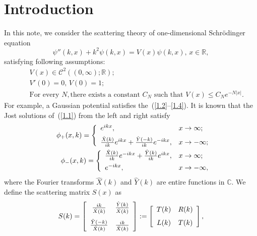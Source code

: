 \documentclass[10pt,a4paper]{article}
\theoremstyle{plain}
\theoremstyle{definition}
\theoremstyle{remark}
\numberwithin{equation}{section}
\begin{document}
\section{Introduction}
In this note, we consider the scattering theory of one-dimensional Schr\"{o}dinger equation
\begin{equation}\label{1.1}
\psi''(k,x)+k^{2}\psi(k,x)=V(x)\psi(k,x),\,x\in\mathbb{R},
\end{equation}
satisfying following assumptions:
\begin{eqnarray}\label{1.2}
&&V(x)\in \mathcal{C}^{2}((0,\infty);\mathbb{R});\\
&&V'(0)=0,\,V(0)=1;\\\label{1.4}
&&\mbox{For every }N, \mbox{there exists a constant }C_{N}\mbox{ such that }V(x)\leq C_{N}e^{-N|x|}.
\end{eqnarray}
For example, a Gaussian potential satisfies the~(\ref{1.2}--\ref{1.4}). 
It is known that the Jost solutions of~(\ref{1.1}) from the left and right satisfy
\begin{eqnarray}\label{AB}
&&\phi_{+}(x,k)=\left\{%
\begin{array}{ll}
e^{ikx},&x\rightarrow\infty;\vspace{5pt}\\
\frac{\hat{X}(k)}{ik}e^{ikx}+\frac{\hat{Y}(-k)}{ik}e^{-ikx},&x\rightarrow-\infty;\label{CD}
\end{array}%
\right.\\
&&\phi_{-}(x,k)=\left\{%
\begin{array}{ll}
\frac{\hat{X}(k)}{ik}e^{-ikx}+\frac{\hat{Y}(k)}{ik}e^{ikx},&x\rightarrow\infty;\vspace{5pt}\\
e^{-ikx},&x\rightarrow-\infty,
\end{array}%
\right.
\end{eqnarray}
where the Fourier transforms $\hat{X}(k)$ and $\hat{Y}(k)$ are entire functions in $\mathbb{C}$. We define the scattering matrix $S(x)$ as
\begin{equation}\label{S}
S(k)=\left[\begin{array}{cc}\frac{ik}{\hat{X}(k)} & \frac{\hat{Y}(k)}{\hat{X}(k)} \vspace{7pt}\\\frac{\hat{Y}(-k)}{\hat{X}(k)} & \frac{ik}{\hat{X}(k)}\end{array}\right]:=\left[\begin{array}{cc}T(k) & R(k) \vspace{7pt}\\L(k) & T(k)\end{array}\right],
\end{equation}
\end{document}
